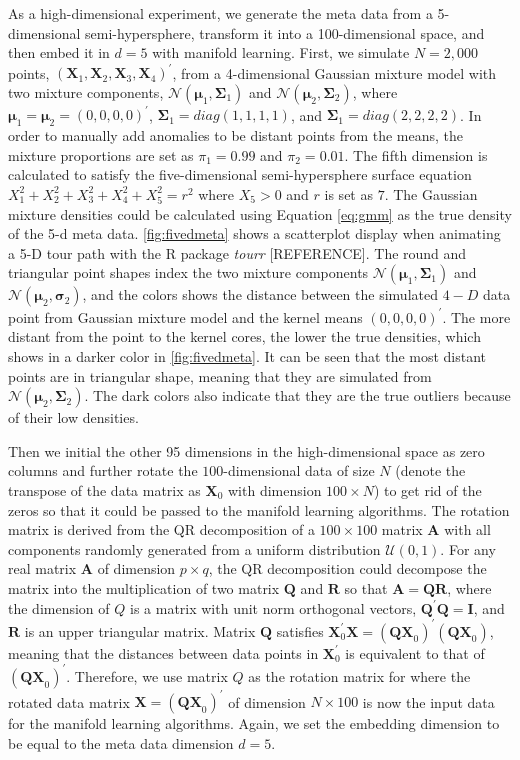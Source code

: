 \documentclass[11pt,a4paper,]{article}
\begin{document}
As a high-dimensional experiment, we generate the meta data from a 5-dimensional semi-hypersphere, transform it into a 100-dimensional space, and then embed it in \(d=5\) with manifold learning. First, we simulate \(N=2,000\) points, \((\pmb{X}_1, \pmb{X}_2, \pmb{X}_3, \pmb{X}_4)^\prime\), from a 4-dimensional Gaussian mixture model with two mixture components, \(\mathcal{N}(\pmb{\mu}_1, \pmb{\Sigma}_1)\) and \(\mathcal{N}(\pmb{\mu}_2, \pmb{\Sigma}_2)\), where \(\pmb{\mu}_1 = \pmb{\mu}_2 =(0, 0, 0, 0)^\prime\), \(\pmb{\Sigma}_1 = diag(1,1,1,1)\), and \(\pmb{\Sigma}_1 = diag(2,2,2,2)\). In order to manually add anomalies to be distant points from the means, the mixture proportions are set as \(\pi_1=0.99\) and \(\pi_2=0.01\).
The fifth dimension is calculated to satisfy the five-dimensional semi-hypersphere surface equation \(X_1^2 + X_2^2 + X_3^2 + X_4^2 + X_5^2 = r^2\) where \(X_5>0\) and \(r\) is set as \(7\).
The Gaussian mixture densities could be calculated using Equation \eqref{eq:gmm} as the true density of the 5-d meta data. \autoref{fig:fivedmeta} shows a scatterplot display when animating a 5-D tour path with the R package \emph{tourr} {[}REFERENCE{]}. The round and triangular point shapes index the two mixture components \(\mathcal{N}(\pmb{\mu}_1, \pmb{\Sigma}_1)\) and \(\mathcal{N}(\pmb{\mu}_2, \pmb{\sigma}_2)\), and the colors shows the distance between the simulated \(4-D\) data point from Gaussian mixture model and the kernel means \((0, 0, 0, 0)^\prime\). The more distant from the point to the kernel cores, the lower the true densities, which shows in a darker color in \autoref{fig:fivedmeta}. It can be seen that the most distant points are in triangular shape, meaning that they are simulated from \(\mathcal{N}(\pmb{\mu}_2, \pmb{\Sigma}_2)\). The dark colors also indicate that they are the true outliers because of their low densities.

Then we initial the other 95 dimensions in the high-dimensional space as zero columns and further rotate the \(100\)-dimensional data of size \(N\) (denote the transpose of the data matrix as \(\pmb{X}_0\) with dimension \(100 \times N\)) to get rid of the zeros so that it could be passed to the manifold learning algorithms.
The rotation matrix is derived from the QR decomposition of a \(100\times 100\) matrix \(\pmb{A}\) with all components randomly generated from a uniform distribution \(\mathcal{U}(0,1)\).
For any real matrix \(\pmb{A}\) of dimension \(p\times q\), the QR decomposition could decompose the matrix into the multiplication of two matrix \(\pmb{Q}\) and \(\pmb{R}\) so that \(\pmb{A} = \pmb{QR}\), where the dimension of \(Q\) is a matrix with unit norm orthogonal vectors, \(\pmb{Q}^\prime \pmb{Q} = \pmb{I}\), and \(\pmb{R}\) is an upper triangular matrix. Matrix \(\pmb{Q}\) satisfies
\(\pmb{X}_0^\prime \pmb{X}=(\pmb{QX}_0)^\prime(\pmb{QX}_0)\), meaning that the distances between data points in \(\pmb{X}_0^\prime\) is equivalent to that of \((\pmb{QX}_0)^\prime\). Therefore, we use matrix \(Q\) as the rotation matrix for where the rotated data matrix \(\pmb{X} = (\pmb{QX}_0)^\prime\) of dimension \(N \times 100\) is now the input data for the manifold learning algorithms. Again, we set the embedding dimension to be equal to the meta data dimension \(d=5\).
\end{document}
